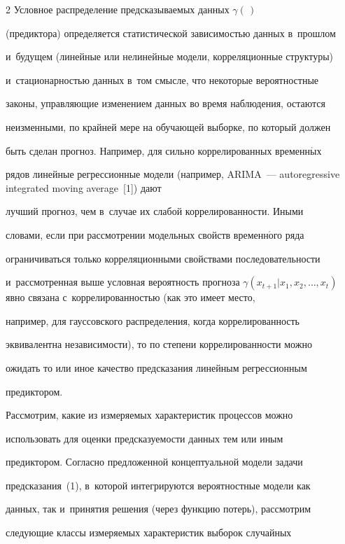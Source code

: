 \begin{multicols}{2}
  Условное распределение предсказываемых данных $\gamma (\,)$ 


(предиктора) определяется статистической зависимостью данных в~прошлом 


и~будущем (линейные или нелинейные модели, корреляционные структуры) 


и~стационарностью данных в~том смыс\-ле, что некоторые вероятностные 


законы, управ\-ля\-ющие изменением данных во время наблюдения, остаются 


неизменными, по крайней мере на обуча\-ющей выборке, по который должен 


быть сделан прогноз. Например, для сильно коррелированных временн$\acute{\mbox{ы}}$х 


рядов линейные регрессионные модели (например, ARIMA~--- autoregressive integrated moving average~[1]) дают 


лучший прогноз, чем в~случае их слабой коррелированности. Иными 


словами, если при рассмотрении модельных свойств временн$\acute{\mbox{о}}$го ряда 


ограничиваться только корреляционными свойствами последовательности 


и~рассмотренная выше условная вероятность прогноза $\gamma(x_{t+1}\vert  


x_1, x_2, \ldots, x_t)$ явно связана с~коррелированностью (как это имеет место, 


например, для гауссовского распределения, когда коррелированность 


эквивалентна независимости), то по степени коррелированности можно 


ожидать то или иное качество предсказания линейным регрессионным 


пре\-дик\-тором.





  


  Рассмотрим, какие из измеряемых характеристик процессов можно 


использовать для оценки предсказуемости данных тем или иным 


предиктором. Согласно предложенной концептуальной модели задачи 


предсказания~(1), в~которой интегрируются вероятностные модели как 


данных, так и~принятия решения (через функцию потерь), рассмотрим 


следующие классы измеряемых характеристик выборок случайных 



\end{multicols}
